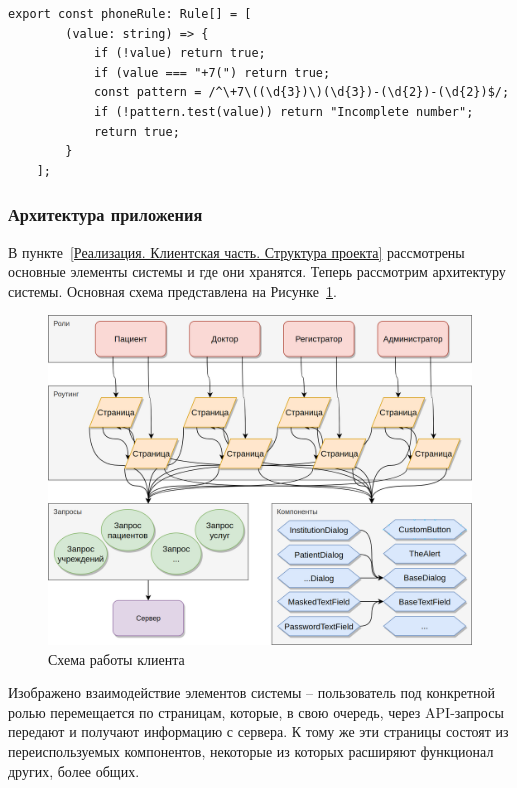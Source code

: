 \documentclass[a4paper,article]{article}
\begin{document}
\begin{sloppypar}
    \begin{lstlisting}[label=phonerule,caption=Пример проверки корректности телефона]
    export const phoneRule: Rule[] = [
        (value: string) => {
            if (!value) return true;
            if (value === "+7(") return true;
            const pattern = /^\+7\((\d{3})\)(\d{3})-(\d{2})-(\d{2})$/;
            if (!pattern.test(value)) return "Incomplete number";
            return true;
        }
    ];
    \end{lstlisting}

    \subsubsection{Архитектура приложения}\label{Реализация. Клиентская часть. Архитектура слоёв}

    В пункте~\ref{Реализация. Клиентская часть. Структура проекта} рассмотрены основные элементы системы и где они хранятся. Теперь рассмотрим архитектуру системы. Основная схема представлена на Рисунке~\ref{fig:Схема работы клиента}.

    \begin{figure}[h]
        \centering
        \includegraphics[width=0.9\linewidth]{Схема работы клиента.png}
        \caption{\centering Схема работы клиента}
        \label{fig:Схема работы клиента}
    \end{figure}
    
    \newpage

    Изображено взаимодействие элементов системы -- пользователь под конкретной ролью перемещается по страницам, которые, в свою очередь, через API-запросы передают и получают информацию с сервера. К тому же эти страницы состоят из переиспользуемых компонентов, некоторые из которых расширяют функционал других, более общих.


\end{sloppypar}
\end{document}

